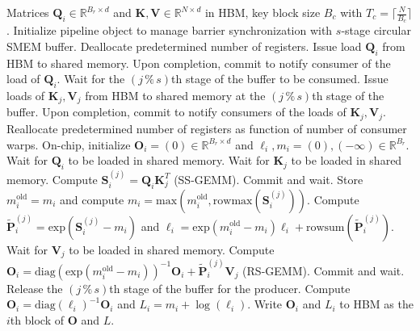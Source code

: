 \begin{algorithm}[H]
    \caption{\small\label{alg:flash3_wgmma_ws_only}\textsc{FlashAttention-3} forward pass \textbf{without} intra-consumer overlapping -- CTA view}
    \begin{algorithmic}[1]
\REQUIRE Matrices $\mathbf{Q}_i \in \mathbb{R}^{B_r \times d}$ and $\mathbf{K}, \mathbf{V} \in \mathbb{R}^{N \times d}$ in HBM, key block size $B_c$ with $T_c = \lceil \frac{N}{B_c} \rceil$.
\STATE Initialize pipeline object to manage barrier synchronization with $s$-stage circular SMEM buffer.
\STATE Deallocate predetermined number of registers.
\STATE Issue load $\mathbf{Q}_i$ from HBM to shared memory.
\STATE Upon completion, commit to notify consumer of the load of $\mathbf{Q}_i$.
    \STATE Wait for the $(j\,\%\,s)$th stage of the buffer to be consumed.
    \STATE Issue loads of $\mathbf{K}_j, \mathbf{V}_j$ from HBM to shared memory at the $(j\,\%\,s)$th stage of the buffer.
    \STATE Upon completion, commit to notify consumers of the loads of $\mathbf{K}_j, \mathbf{V}_j$.
\ENDFOR
\ELSE \STATE Reallocate predetermined number of registers as function of number of consumer warps.
\STATE On-chip, initialize $\mathbf{O}_i = (0) \in \mathbb{R}^{B_r \times d}$ and $\ell_i, m_i = (0), (-\infty) \in \mathbb{R}^{B_r}$.
\STATE Wait for $\mathbf{Q}_i$ to be loaded in shared memory.
\STATE Wait for $\mathbf{K}_j$ to be loaded in shared memory.
\STATE Compute $\mathbf{S}_i^{(j)} = \mathbf{Q}_i \mathbf{K}_j^T$ (SS-GEMM). Commit and wait. \label{alg:ws_only_gemm1}
\STATE Store $m_i^{\mathrm{old}} = m_i$ and compute $m_i = \mathrm{max}(m_i^{\mathrm{old}}, \mathrm{rowmax}(\mathbf{S}_i^{(j)}))$. \label{code-ws:softmax_start}
\STATE Compute $\widetilde{\mathbf{P}}_i^{(j)} = \mathrm{exp}(\mathbf{S}_i^{(j)} - m_i)$ and $\ell_i = \mathrm{exp}(m_i^{\mathrm{old}} - m_i) \ell_i + \mathrm{rowsum}(\widetilde{\mathbf{P}}_i^{(j)})$. \label{code-ws:softmax_end}
\STATE Wait for $\mathbf{V}_j$ to be loaded in shared memory.
\STATE Compute $\mathbf{O}_i = \mathrm{diag}(\mathrm{exp}(m_i^{\mathrm{old}} - m_i))^{-1} \mathbf{O}_i + \widetilde{\mathbf{P}}_i^{(j)} \mathbf{V}_j$ (RS-GEMM). Commit and wait. \label{alg:ws_only_gemm2}
\STATE Release the $(j\,\%\,s)$th stage of the buffer for the producer.
\ENDFOR
\STATE Compute $\mathbf{O}_i = \mathrm{diag}(\ell_i)^{-1} \mathbf{O}_i$ and $L_i = m_i + \log(\ell_i)$.
\STATE Write $\mathbf{O}_i$ and $L_i$ to HBM as the $i$th block of $\mathbf{O}$ and $L$.
\ENDIF
\end{algorithmic}
\end{algorithm}

